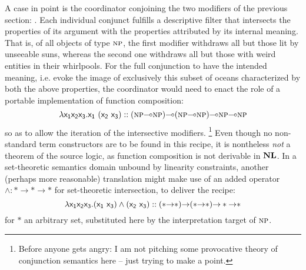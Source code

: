 A case in point is the coordinator  conjoining the two modifiers of the previous section: .
Each individual conjunct fulfills a descriptive filter that intersects the properties of its argument with the properties attributed by its internal meaning.
That is, of all objects of type $\smallprop{NP}$, the first modifier withdraws all but those lit by unseeable suns, whereas the second one withdraws all but those with weird entities in their whirlpools.
For the full conjunction to have the intended meaning, i.e. evoke the image of exclusively this subset of oceans characterized by both the above properties, the coordinator would need to enact the role of a portable implementation of function composition:
\[
\lambda \smallterm{x_1x_2x_3.x_1~(x_2~x_3)} :: (\smallprop{np}\li \smallprop{np})\li(\smallprop{np}\li \smallprop{np})\li\smallprop{np}\li\smallprop{np}
\]
so as to allow the iteration of the intersective modifiers.%
\footnote{Before anyone gets angry: I am not pitching some provocative theory of conjunction semantics here -- just trying to make a point.}
Even though no non-standard term constructors are to be found in this recipe, it is nontheless \textit{not} a theorem of the source logic, as function composition is not derivable in $\textbf{NL}$.
In a set-theoretic semantics domain unbound by linearity constraints, another (perhaps more reasonable) translation might make use of an added operator $\wedge : * \to * \to *$ for set-theoretic intersection, to deliver the recipe:
\[
\lambda \smallterm{x_1x_2x_3.(x_1~x_3)\wedge(x_2~x_3)} :: (*\ii *)\ii(*\ii *)\ii * \ii *
\]
for $*$ an arbitrary set, substituted here by the interpretation target of $\smallprop{NP}$.


